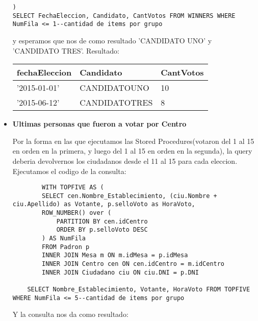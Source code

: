\begin{itemize}
\begin{lstlisting}
)
SELECT FechaEleccion, Candidato, CantVotos FROM WINNERS WHERE NumFila <= 1--cantidad de items por grupo
\end{lstlisting}


 y esperamos que nos de como resultado 'CANDIDATO UNO' y 'CANDIDATO TRES'. Resultado:
 
 \begin{tabular}{| l| l| l| }
	\hline 
	    fechaEleccion & Candidato & CantVotos \\
	   \hline
	  '2015-01-01' & CANDIDATOUNO & 10 \\
 	 \hline 
 	   '2015-06-12' & CANDIDATOTRES & 8 \\
 	 \hline 
	\end{tabular}
	
	\vspace{2mm}	


\item \textbf{Ultimas personas que fueron a votar por Centro}

Por la forma en las que ejecutamos las Stored Procedures(votaron del 1 al 15 en orden en la primera, y luego del 1 al 15 en orden en la segunda), la query deberia devolvernos los ciudadanos desde el 11 al 15 para cada eleccion. Ejecutamos el codigo de la consulta:

\begin{lstlisting}
		WITH TOPFIVE AS (
	    SELECT cen.Nombre_Establecimiento, (ciu.Nombre + ciu.Apellido) as Votante, p.selloVoto as HoraVoto,
	    ROW_NUMBER() over (
	        PARTITION BY cen.idCentro
	        ORDER BY p.selloVoto DESC
	    ) AS NumFila
	    FROM Padron p
	    INNER JOIN Mesa m ON m.idMesa = p.idMesa
	    INNER JOIN Centro cen ON cen.idCentro = m.idCentro
	    INNER JOIN Ciudadano ciu ON ciu.DNI = p.DNI
	    
	SELECT Nombre_Establecimiento, Votante, HoraVoto FROM TOPFIVE WHERE NumFila <= 5--cantidad de items por grupo
	\end{lstlisting}

Y la consulta nos da como resultado:



\end{itemize}

